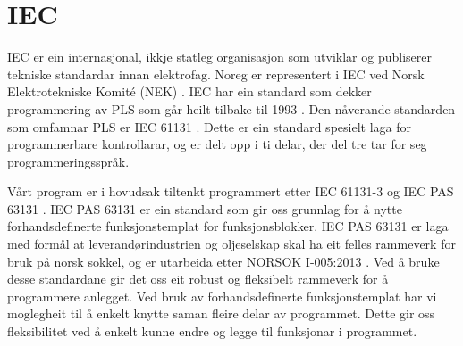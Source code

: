 \section{IEC}
\thispagestyle{fancy}
\label{sec:5.2}


\gls{IEC} \citep{IEC} er ein internasjonal, ikkje statleg organisasjon som utviklar og publiserer tekniske standardar innan elektrofag. 
Noreg er representert i \gls{IEC} ved Norsk Elektrotekniske Komité (\gls{NEK}) \citep{IEC-SNL}. 
\gls{IEC} har ein standard som dekker programmering av \gls{PLS} som går heilt tilbake til 1993 \citep{Wiki-93}. 
Den nåverande standarden som omfamnar PLS er IEC 61131 \citep{IEC-61131}. Dette er ein standard spesielt laga for programmerbare kontrollarar, og er delt opp i ti delar, der del tre tar for seg programmeringsspråk. 

Vårt program er i hovudsak tiltenkt programmert etter \gls{IEC} 61131-3 og \gls{IEC} \gls{PAS} 63131 \citep{IEC-63131}. 
\Gls{IEC} \gls{PAS} 63131 er ein standard som gir oss grunnlag for å nytte forhandsdefinerte funksjonstemplat for funksjonsblokker. 
\gls{IEC} \gls{PAS} 63131 er laga med formål at leverandørindustrien og oljeselskap skal ha eit felles rammeverk for bruk på norsk sokkel, og er utarbeida etter NORSOK I-005:2013 \citep{NORSOK}.
Ved å bruke desse standardane gir det oss eit robust og fleksibelt rammeverk for å programmere anlegget. 
Ved bruk av forhandsdefinerte funksjonstemplat har vi moglegheit til å enkelt knytte saman fleire delar av programmet. 
Dette gir oss fleksibilitet ved å enkelt kunne endre og legge til funksjonar i programmet.  
\newpage

